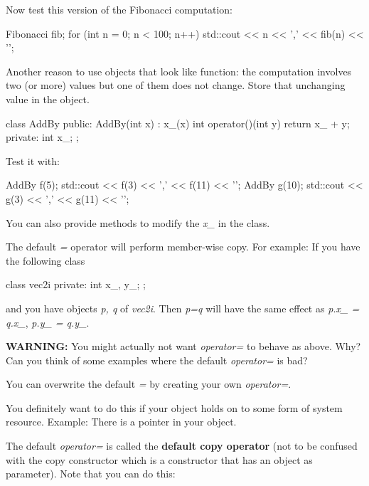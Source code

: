Now test this version of the Fibonacci computation:

\begin{consolethree}[escapeinside=||]
Fibonacci fib;
for (int n = 0; n < 100; n++)
{
    std::cout << n << ',' << fib(n) << '\n';
}
\end{consolethree}

Another reason to use objects that look like function: the computation
involves two (or more) values but one of them does not change. Store
that unchanging value in the object.

\begin{consolethree}[escapeinside=||]
class AddBy
{
public:
    AddBy(int x) : x_(x) {}
    int operator()(int y) { return x_ + y; }
private:
    int x_;
};
\end{consolethree}

Test it with:

\begin{consolethree}[escapeinside=||]
AddBy f(5);
std::cout << f(3) << ',' << f(11) << '\n';
AddBy g(10);
std::cout << g(3) << ',' << g(11) << '\n';
\end{consolethree}

You can also provide methods to modify the \textit{x\_} in the class.


\newpage{}

The default \textit{=} operator will perform member-wise copy. For
example: If you have the following class

\begin{consolethree}[escapeinside=||]
class vec2i
{
private:
    int x_, y_;
};
\end{consolethree}

and you have objects \textit{p, q} of \textit{vec2i}. Then \textit{p=q} will
have the same effect as \textit{p.x\_ = q.x\_}, \textit{p.y\_ = q.y\_}.

\textbf{WARNING:} You might actually not want \textit{operator=} to behave
as above. Why? Can you think of some examples where the default
\textit{operator=} is bad?

You can overwrite the default \textit{=} by creating your own
\textit{operator=}.

You definitely want to do this if your object holds on to some form of
system resource. Example: There is a pointer in your object.

The default \textit{operator=} is called the \textbf{default copy
operator} (not to be confused with the copy constructor which is a
constructor that has an object as parameter). Note that you can do this:

